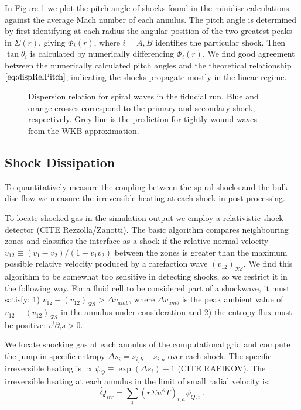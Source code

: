 \documentclass{emulateapj}
\begin{document}
In Figure \ref{fi:disp} we plot the pitch angle of shocks found in the minidisc calculations against the average Mach number of each annulus. The pitch angle is determined by first identifying at each radius the angular position of the two greatest peaks in $\Sigma(r)$, giving $\Phi_i(r)$, where $i=A,B$ identifies the particular shock. Then $\tan \theta_i$ is calculated by numerically differencing $\Phi_i(r)$. We find good agreement between the numerically calculated pitch angles and the theoretical relationship $\eqref{eq:dispRelPitch}$, indicating the shocks propagate mostly in the linear regime.

\begin{figure}
\caption{\label{fi:disp} Dispersion relation for spiral waves in the fiducial run. Blue and orange crosses correspond to the primary and secondary shock, respectively.  Grey line is the prediction for tightly wound waves from the WKB approximation.}
\end{figure}



\subsection{Shock Dissipation}
\label{subsec:diss}

To quantitatively measure the coupling between the spiral shocks and the bulk disc flow we measure the irreversible heating at each shock in post-processing. 

To locate shocked gas in the simulation output we employ a relativistic shock detector (CITE Rezzolla/Zanotti).  The basic algorithm compares neighbouring zones and classifies the interface as a shock if the relative normal velocity $v_{12} \equiv (v_1 - v_2) / (1-v_1 v_2)$ between the zones is greater than the maximum possible relative velocity produced by a rarefaction wave $(v_{12})_{\mathcal{RS}}$.  We find this algorithm to be somewhat too sensitive in detecting shocks, so we restrict it in the following way.  For a fluid cell to be considered part of a shockwave, it must satisfy: 1) $v_{12} - (v_{12})_{\mathcal{RS}} > \Delta v_{amb}$, where $\Delta v_{amb}$ is the peak ambient value of $v_{12} - (v_{12})_{\mathcal{RS}}$ in the annulus under consideration and 2) the entropy flux must be positive: $v^i \partial_i s > 0$.

We locate shocking gas at each annulus of the computational grid and compute the jump in specific entropy $\Delta s_i = s_{i,b} - s_{i,a}$ over each shock.  The specific irreversible heating is $\propto \psi_Q \equiv \exp{(\Delta s_i)} - 1$ (CITE RAFIKOV).  The irreversible heating at each annulus in the limit of small radial velocity is:
\begin{equation}
	\dot{Q}_{irr} = \sum_i \left( r\Sigma u^\phi T \right)_{i,a} \psi_{Q,i} \ .
\end{equation}
\end{document}
